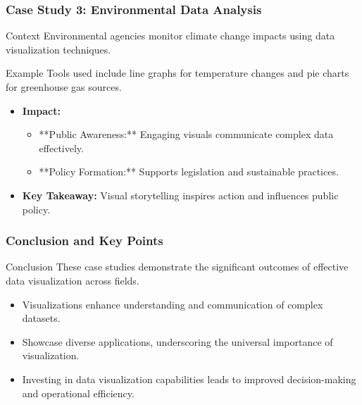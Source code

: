 \documentclass[aspectratio=169]{beamer}
\begin{document}
\begin{frame}[fragile]
    \frametitle{Case Study 3: Environmental Data Analysis}
    \begin{block}{Context}
        Environmental agencies monitor climate change impacts using data visualization techniques.
    \end{block}
    \begin{block}{Example}
        Tools used include line graphs for temperature changes and pie charts for greenhouse gas sources.
    \end{block}
    \begin{itemize}
        \item \textbf{Impact:}
            \begin{itemize}
                \item **Public Awareness:** Engaging visuals communicate complex data effectively.
                \item **Policy Formation:** Supports legislation and sustainable practices.
            \end{itemize}
        \item \textbf{Key Takeaway:} Visual storytelling inspires action and influences public policy.
    \end{itemize}
\end{frame}

\begin{frame}[fragile]
    \frametitle{Conclusion and Key Points}
    \begin{block}{Conclusion}
        These case studies demonstrate the significant outcomes of effective data visualization across fields.
    \end{block}
    \begin{itemize}
        \item Visualizations enhance understanding and communication of complex datasets.
        \item Showcase diverse applications, underscoring the universal importance of visualization.
        \item Investing in data visualization capabilities leads to improved decision-making and operational efficiency.
    \end{itemize}
\end{frame}
\end{document}
